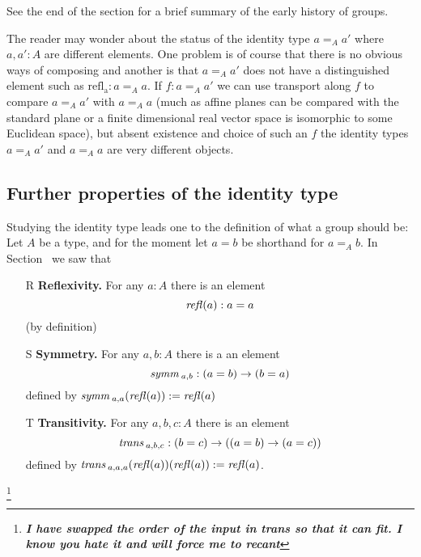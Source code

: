 See the end of the section  for a brief summary of the early history of groups.  
\begin{remark}
  The reader may wonder about the status of the identity type $a=_Aa'$ where $a,a':A$ are different elements.  One problem is of course that there is no obvious ways of composing and another is that $a=_Aa'$ does not have a distinguished element such as $\mathrm{refl{}_a}:a=_Aa$.
If $f:a=_Aa'$ we can use transport along $f$ to compare $a=_Aa'$ with $a=_Aa$ (much as affine planes can be compared with the standard plane or a finite dimensional real vector space is isomorphic to some Euclidean space), but absent existence and choice of such an $f$ the identity types $a=_Aa'$ and $a=_Aa$ are very different objects.
\end{remark}

\subsection{Further properties of the identity type}
Studying the identity type leads one to the definition of what a group should be:
Let $A$ be a type, and for the moment let $a=b$ be shorthand for $a=_Ab$.  In Section~ we saw that
\begin{enumerate}
\item[R] {\bf Reflexivity.} For any $a:A$ there is an element 
$$\mathop{{\it refl}}(a):a=a$$ (by definition)
\item[S] {\bf Symmetry.} For any $a,b:A$ there is a an element $$\mathop{{\it symm}}{}_{a,b}:(a=b)\to (b=a)$$ defined by $\mathop{{\it symm}}{}_{a,a}(\mathop{{\it refl}}(a)):=\mathop{{\it refl}}(a)$
\item[T] {\bf Transitivity.} For any $a,b,c:A$ there is an element $$\mathop{{\it trans}}{}_{a,b,c}:(b=c)\to((a=b)\to(a=c))$$ defined by $\mathop{{\it trans}}{}_{a,a,a}(\mathop{{\it refl}}(a))(\mathop{{\it refl}}(a)):=\mathop{{\it refl}}(a)$.
\end{enumerate}
\footnote{\em\bf I have swapped the order of the input in trans so that it can fit.  I know you hate it and will force me to recant}

